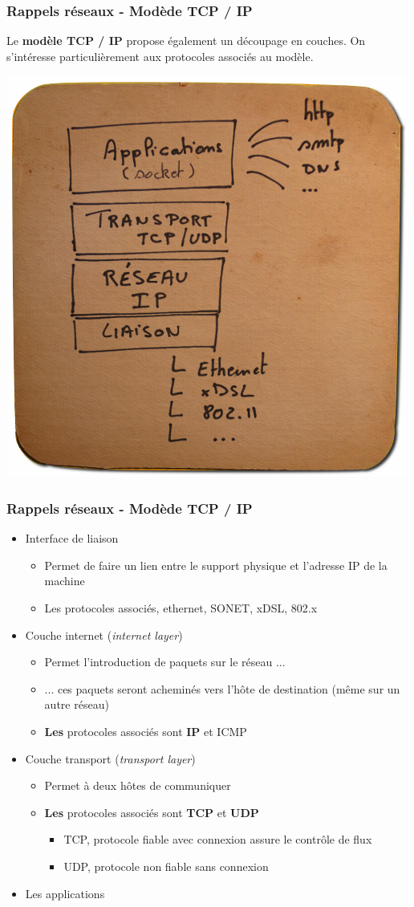\begin{frame}[fragile]
  \frametitle{Rappels réseaux - Modède TCP / IP}
Le \textbf{modèle TCP / IP} propose également un découpage en couches. On s'intéresse particulièrement aux protocoles associés au modèle.

\begin{center}
	\includegraphics[width=.55\linewidth]{img/sousbock-modele-tcpip.png}
\end{center}
\end{frame}

\begin{frame}[fragile]
  \frametitle{Rappels réseaux - Modède TCP / IP}
\begin{itemize}
	\item Interface de liaison
	\begin{itemize}
		\item Permet de faire un lien entre le support physique et l'adresse IP de la machine
		\item Les protocoles associés, ethernet, SONET, xDSL, 802.x
	\end{itemize}
	\item Couche internet (\textit{internet layer})
	\begin{itemize}
		\item Permet l'introduction de paquets sur le réseau ...
		\item ... ces paquets seront acheminés vers l'hôte de destination (même sur un autre réseau)
		\item \textbf{Les} protocoles associés sont \textbf{IP} et ICMP
	\end{itemize}
	\item Couche transport (\textit{transport layer})
	\begin{itemize}
		\item Permet à deux hôtes de communiquer
		\item \textbf{Les} protocoles associés sont \textbf{TCP} et \textbf{UDP}
		\begin{itemize}
			\item TCP, protocole fiable avec connexion assure le contrôle de flux
			\item UDP, protocole non fiable sans connexion
		\end{itemize}
	\end{itemize}
	\item Les applications
\end{itemize}
\end{frame}


